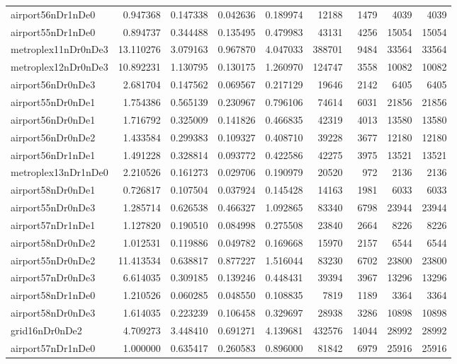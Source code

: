 \begin{longtable}{|l|r|r|r|r|r|r|r|r|}
airport56nDr1nDe0 & 0.947368 & 0.147338 & 0.042636 & 0.189974 & 12188 & 1479 & 4039 & 4039 \\
airport55nDr1nDe0 & 0.894737 & 0.344488 & 0.135495 & 0.479983 & 43131 & 4256 & 15054 & 15054 \\
metroplex11nDr0nDe3 & 13.110276 & 3.079163 & 0.967870 & 4.047033 & 388701 & 9484 & 33564 & 33564 \\
metroplex12nDr0nDe3 & 10.892231 & 1.130795 & 0.130175 & 1.260970 & 124747 & 3558 & 10082 & 10082 \\
airport56nDr0nDe3 & 2.681704 & 0.147562 & 0.069567 & 0.217129 & 19646 & 2142 & 6405 & 6405 \\
airport55nDr0nDe1 & 1.754386 & 0.565139 & 0.230967 & 0.796106 & 74614 & 6031 & 21856 & 21856 \\
airport56nDr0nDe1 & 1.716792 & 0.325009 & 0.141826 & 0.466835 & 42319 & 4013 & 13580 & 13580 \\
airport56nDr0nDe2 & 1.433584 & 0.299383 & 0.109327 & 0.408710 & 39228 & 3677 & 12180 & 12180 \\
airport56nDr1nDe1 & 1.491228 & 0.328814 & 0.093772 & 0.422586 & 42275 & 3975 & 13521 & 13521 \\
metroplex13nDr1nDe0 & 2.210526 & 0.161273 & 0.029706 & 0.190979 & 20520 & 972 & 2136 & 2136 \\
airport58nDr0nDe1 & 0.726817 & 0.107504 & 0.037924 & 0.145428 & 14163 & 1981 & 6033 & 6033 \\
airport55nDr0nDe3 & 1.285714 & 0.626538 & 0.466327 & 1.092865 & 83340 & 6798 & 23944 & 23944 \\
airport57nDr1nDe1 & 1.127820 & 0.190510 & 0.084998 & 0.275508 & 23840 & 2664 & 8226 & 8226 \\
airport58nDr0nDe2 & 1.012531 & 0.119886 & 0.049782 & 0.169668 & 15970 & 2157 & 6544 & 6544 \\
airport55nDr0nDe2 & 11.413534 & 0.638817 & 0.877227 & 1.516044 & 83230 & 6702 & 23800 & 23800 \\
airport57nDr0nDe3 & 6.614035 & 0.309185 & 0.139246 & 0.448431 & 39394 & 3967 & 13296 & 13296 \\
airport58nDr1nDe0 & 1.210526 & 0.060285 & 0.048550 & 0.108835 & 7819 & 1189 & 3364 & 3364 \\
airport58nDr0nDe3 & 1.614035 & 0.223239 & 0.106458 & 0.329697 & 28938 & 3286 & 10898 & 10898 \\
grid16nDr0nDe2 & 4.709273 & 3.448410 & 0.691271 & 4.139681 & 432576 & 14044 & 28992 & 28992 \\
airport57nDr1nDe0 & 1.000000 & 0.635417 & 0.260583 & 0.896000 & 81842 & 6979 & 25916 & 25916 \\

\end{longtable}
